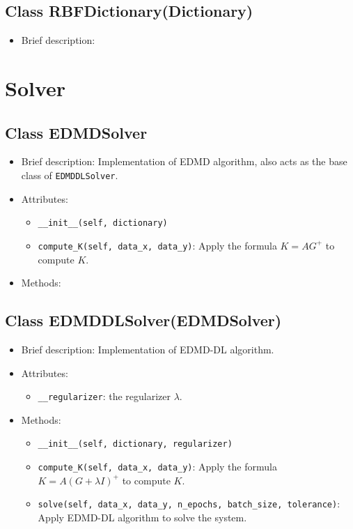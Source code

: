 \documentclass[en, bibend=bibtex]{elegantpaper}
\theoremstyle{plain}
\begin{document}
\subsection{Class RBFDictionary(Dictionary)}

\begin{itemize}
\item Brief description: 
\end{itemize}

\section{Solver}

\subsection{Class EDMDSolver}

\begin{itemize}
\item Brief description: Implementation of EDMD algorithm,
  also acts as the base class of \lstinline|EDMDDLSolver|.
\item Attributes:
  \begin{itemize}
  \item \lstinline|__init__(self, dictionary)|
  \item \lstinline|compute_K(self, data_x, data_y)|:
    Apply the formula $K = AG^+$ to compute $K$.
  \end{itemize}
\item Methods:
\end{itemize}



\subsection{Class EDMDDLSolver(EDMDSolver)}

\begin{itemize}
\item Brief description: Implementation of EDMD-DL algorithm.
\item Attributes:
  \begin{itemize}
  \item \lstinline|__regularizer|: the regularizer $\lambda$.
  \end{itemize}
\item Methods:
  \begin{itemize}
  \item \lstinline|__init__(self, dictionary, regularizer)|
  \item \lstinline|compute_K(self, data_x, data_y)|:
    Apply the formula $K = A(G + \lambda I)^+$ to compute $K$.
  \item \lstinline|solve(self, data_x, data_y, n_epochs, batch_size, tolerance)|:
    Apply EDMD-DL algorithm to solve the system.
  \end{itemize}
\end{itemize}
\end{document}

